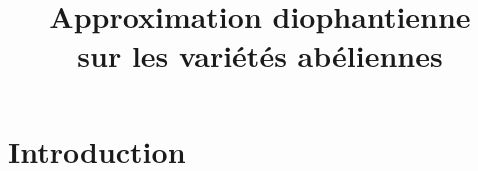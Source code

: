 \documentclass{mpg-preth}
\title{Approximation diophantienne \\ sur les variétés abéliennes}
\begin{document}
\setupmagicinclude

\maketitle

\section*{Introduction}


\end{document}
